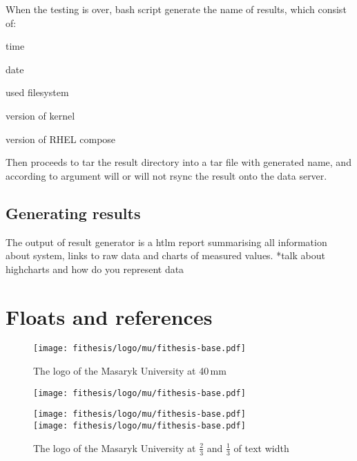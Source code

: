 \documentclass[
  color, %
  table, %
  lof,   %
  lot,   %
]{fithesis3}
\begin{document}
When the testing is over, bash script generate the name of results, which consist of:
\begin{compactenum}
  \item time
  \item date
  \item used filesystem
  \item version of kernel
  \item version of RHEL compose
\end{compactenum}

Then proceeds to tar the result directory into a tar file with generated name, and according to argument will or will not rsync the result onto the data server.




\section{Generating results}
The output of result generator is a htlm report summarising all information about system, links to raw data and charts of measured values.
*talk about highcharts and how do you represent data


\chapter{Floats and references}
\begin{figure}
  \begin{center}
    \texttt{[image: fithesis/logo/mu/fithesis-base.pdf]}
  \end{center}
  \caption{The logo of the Masaryk University at 40\,mm}
  \label{fig:mulogo1}
\end{figure}

\begin{figure}
  \begin{minipage}{.66\textwidth}
    \texttt{[image: fithesis/logo/mu/fithesis-base.pdf]}
  \end{minipage}
  \begin{minipage}{.33\textwidth}
    \texttt{[image: fithesis/logo/mu/fithesis-base.pdf]} \\
    \texttt{[image: fithesis/logo/mu/fithesis-base.pdf]}
  \end{minipage}
  \caption{The logo of the Masaryk University at $\frac23$ and
    $\frac13$ of text width}
  \label{fig:mulogo2}
\end{figure}
\end{document}
